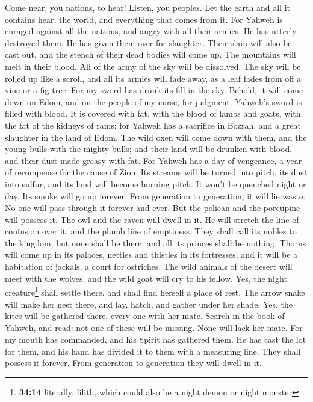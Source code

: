  Come near, you nations, to hear! Listen, you peoples. Let
the earth and all it contains hear, the world, and everything that comes
from it.  For Yahweh is enraged against all the nations,
and angry with all their armies. He has utterly destroyed them. He has
given them over for slaughter.  Their slain will also be
cast out, and the stench of their dead bodies will come up. The
mountains will melt in their blood.  All of the army of
the sky will be dissolved. The sky will be rolled up like a scroll, and
all its armies will fade away, as a leaf fades from off a vine or a fig
tree.  For my sword has drunk its fill in the sky. Behold,
it will come down on Edom, and on the people of my curse, for judgment.
 Yahweh's sword is filled with blood. It is covered with
fat, with the blood of lambs and goats, with the fat of the kidneys of
rams; for Yahweh has a sacrifice in Bozrah, and a great slaughter in the
land of Edom.  The wild oxen will come down with them, and
the young bulls with the mighty bulls; and their land will be drunken
with blood, and their dust made greasy with fat.  For
Yahweh has a day of vengeance, a year of recompense for the cause of
Zion.  Its streams will be turned into pitch, its dust
into sulfur, and its land will become burning pitch.  It
won't be quenched night or day. Its smoke will go up forever. From
generation to generation, it will lie waste. No one will pass through it
forever and ever.  But the pelican and the porcupine will
possess it. The owl and the raven will dwell in it. He will stretch the
line of confusion over it, and the plumb line of emptiness.
 They shall call its nobles to the kingdom, but none
shall be there; and all its princes shall be nothing. 
Thorns will come up in its palaces, nettles and thistles in its
fortresses; and it will be a habitation of jackals, a court for
ostriches.  The wild animals of the desert will meet with
the wolves, and the wild goat will cry to his fellow. Yes, the night
creature\footnote{\textbf{34:14} literally, lilith, which could also be
  a night demon or night monster} shall settle there, and shall find
herself a place of rest.  The arrow snake will make her
nest there, and lay, hatch, and gather under her shade. Yes, the kites
will be gathered there, every one with her mate.  Search
in the book of Yahweh, and read: not one of these will be missing. None
will lack her mate. For my mouth has commanded, and his Spirit has
gathered them.  He has cast the lot for them, and his
hand has divided it to them with a measuring line. They shall possess it
forever. From generation to generation they will dwell in it.

